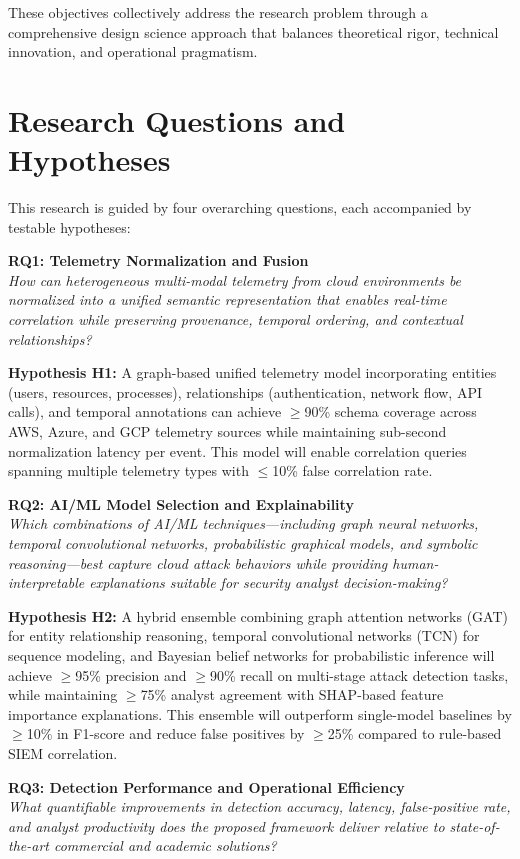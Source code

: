 These objectives collectively address the research problem through a comprehensive design science approach that balances theoretical rigor, technical innovation, and operational pragmatism.

\section{Research Questions and Hypotheses}\label{sec:intro-rq}
This research is guided by four overarching questions, each accompanied by testable hypotheses:

\textbf{RQ1: Telemetry Normalization and Fusion} \\
\emph{How can heterogeneous multi-modal telemetry from cloud environments be normalized into a unified semantic representation that enables real-time correlation while preserving provenance, temporal ordering, and contextual relationships?}

\textbf{Hypothesis H1:} A graph-based unified telemetry model incorporating entities (users, resources, processes), relationships (authentication, network flow, API calls), and temporal annotations can achieve $\geq$90\% schema coverage across AWS, Azure, and GCP telemetry sources while maintaining sub-second normalization latency per event. This model will enable correlation queries spanning multiple telemetry types with $\leq$10\% false correlation rate.

\textbf{RQ2: AI/ML Model Selection and Explainability} \\
\emph{Which combinations of AI/ML techniques---including graph neural networks, temporal convolutional networks, probabilistic graphical models, and symbolic reasoning---best capture cloud attack behaviors while providing human-interpretable explanations suitable for security analyst decision-making?}

\textbf{Hypothesis H2:} A hybrid ensemble combining graph attention networks (GAT) for entity relationship reasoning, temporal convolutional networks (TCN) for sequence modeling, and Bayesian belief networks for probabilistic inference will achieve $\geq$95\% precision and $\geq$90\% recall on multi-stage attack detection tasks, while maintaining $\geq$75\% analyst agreement with SHAP-based feature importance explanations. This ensemble will outperform single-model baselines by $\geq$10\% in F1-score and reduce false positives by $\geq$25\% compared to rule-based SIEM correlation.

\textbf{RQ3: Detection Performance and Operational Efficiency} \\
\emph{What quantifiable improvements in detection accuracy, latency, false-positive rate, and analyst productivity does the proposed framework deliver relative to state-of-the-art commercial and academic solutions?}

